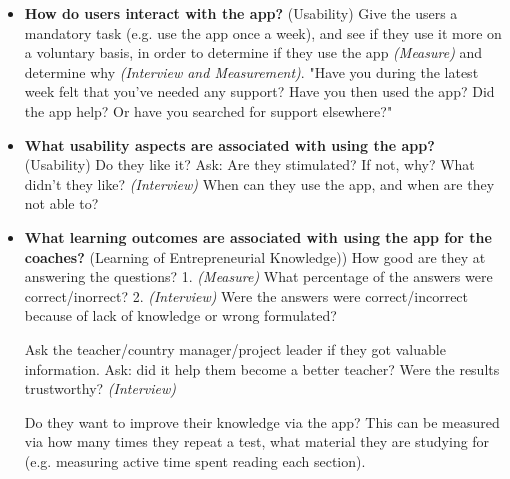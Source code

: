 \begin{itemize}
    \item
    \textbf{How do users interact with the app?} (Usability) Give the users a mandatory task (e.g. use the app once a week), and see if they use it more on a voluntary basis, in order to determine if they use the app
    \textit{(Measure)} and determine why \textit{(Interview and Measurement)}. "Have you during the latest week felt that you've needed any support? Have you then used the app? Did the app help? Or have you searched for support elsewhere?"
\item \textbf{What usability aspects are associated with using the app?} (Usability) Do they like it? Ask: Are they stimulated? If not, why? What didn't they like? \textit{(Interview)} When can they use the app, and when are they not able to?

    \item \textbf{What learning outcomes are associated with using the app for the coaches?}  (Learning of Entrepreneurial Knowledge))
    How good are they at answering the questions? 1.
    \textit{(Measure)} What percentage of the answers were correct/inorrect?  2. \textit{(Interview)} Were the answers were correct/incorrect because of lack of knowledge or wrong formulated?

    Ask the teacher/country manager/project leader if they got valuable information. Ask: did it help them become a better teacher? Were the results trustworthy? \textit{(Interview)}

    Do they want to improve their knowledge via the app? This can be measured via how many times they repeat a test, what material they are studying for (e.g. measuring active time spent reading each section).
\end{itemize}
